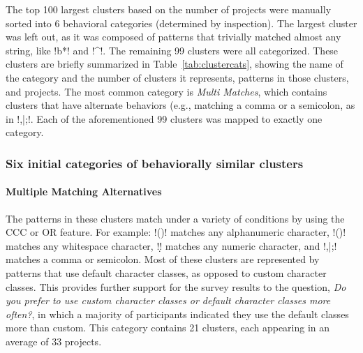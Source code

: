 

The top 100 largest clusters based on the number of projects were manually sorted into 6 behavioral categories (determined by inspection).  The largest cluster was left out, as it was composed of patterns that trivially matched almost any string, like \cverb!b*! and \cverb!^!.  The remaining 99 clusters were all categorized. These clusters are briefly summarized in Table~\ref{tab:clustercats}, showing the name of the category and the number of clusters it represents, patterns in those clusters, and projects. The most common category is \emph{Multi Matches}, which contains clusters that have alternate behaviors (e.g., matching a comma or a semicolon, as in \cverb!,|;!. Each of the aforementioned 99 clusters was mapped to exactly one category.


\subsubsection{Six initial categories of behaviorally similar clusters}
\label{sec:categoriesDefined}
\paragraph{Multiple Matching Alternatives}
The patterns in these clusters match under a variety of conditions by using the CCC or OR feature.  For example: \cverb!(\W)! matches any alphanumeric character, \cverb!(\s)! matches any whitespace character, \cverb!\d! matches any numeric character, and \cverb!,|;! matches a comma or semicolon.  Most of these clusters are represented by patterns that use default character classes, as opposed to custom character classes.  This provides further support for the survey results to the question, \emph{Do you prefer to use custom character classes or default character classes more often?}, in which a majority of participants indicated they use the default classes more than custom.
This category contains 21 clusters, each appearing in an average of 33 projects.

